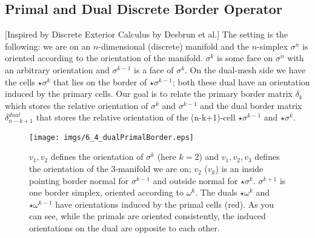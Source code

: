 \begin{appendix}
\chapter{Primal and Dual Discrete Border Operator}
\label{app:dualborder}
[Inspired by Discrete Exterior Calculus by Desbrun et al.]
The setting is the following: we are on an $n$-dimensional (discrete) manifold and the $n$-simplex $\sigma^n$ is oriented according to the orientation of the manifold. $\sigma^k$ is some face on $\sigma^n$ with an arbitrary orientation and $\sigma^{k-1}$ is a face of $\sigma^k$. On the dual-mesh side we have the cells $\star \sigma^k$ that lies on the border of $\star \sigma^{k-1}$; both these dual have an orientation induced by the primary cells. Our goal is to relate the primary border matrix $\delta_k$ which stores the relative orientation of $\sigma^k$ and $\sigma^{k-1}$ 
and the dual border matrix $\delta_{n-k+1}^{dual}$ that stores the relative orientation of the (n-k+1)-cell $\star \sigma^{k-1}$ and $\star \sigma^{k}$.

\begin{figure}[h]
\begin{center}
\texttt{[image: imgs/6\_4\_dualPrimalBorder.eps]}
\end{center}
\caption{$v_1,v_2$ defines the orientation of $\sigma^k$ (here $k=2$) and $v_1,v_2,v_3$ defines the orientation of the 3-manifold we are on; $v_2$ ($v_k$) is an inside pointing border normal for $\sigma^{k-1}$ and outside normal for $\star \sigma^k$. $\sigma^{k+1}$ is one border simplex, oriented according to $\omega^k$. The duals $\star \omega^k$ and $\star \omega^{k-1}$ have orientations induced by the primal cells (red). As you can see, while the primals are oriented consistently, the induced orientations on the dual are opposite to each other.}
\end{figure}


\end{appendix}
